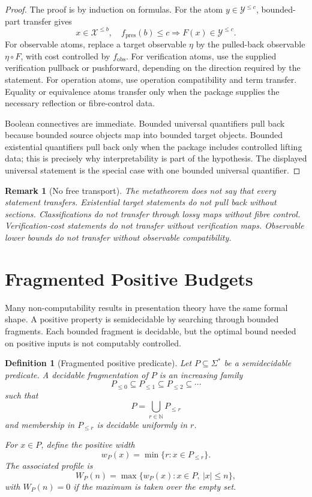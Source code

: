 \documentclass[11pt]{article}
\newtheorem{definition}[theorem]{Definition}
\newtheorem{remark}[theorem]{Remark}
\begin{document}
\begin{proof}
The proof is by induction on formulas. For the atom \(y\in\mathcal Y^{\leq c}\), bounded-part transfer gives
\[
x\in\mathcal X^{\leq b},\quad f_{\mathrm{pres}}(b)\leq c
\Longrightarrow
F(x)\in\mathcal Y^{\leq c}.
\]
For observable atoms, replace a target observable \(\eta\) by the pulled-back observable \(\eta\circ F\), with cost controlled by \(f_{\mathrm{obs}}\). For verification atoms, use the supplied verification pullback or pushforward, depending on the direction required by the statement. For operation atoms, use operation compatibility and term transfer. Equality or equivalence atoms transfer only when the package supplies the necessary reflection or fibre-control data.

Boolean connectives are immediate. Bounded universal quantifiers pull back because bounded source objects map into bounded target objects. Bounded existential quantifiers pull back only when the package includes controlled lifting data; this is precisely why interpretability is part of the hypothesis. The displayed universal statement is the special case with one bounded universal quantifier.
\end{proof}

\begin{remark}[No free transport]
The metatheorem does not say that every statement transfers. Existential target statements do not pull back without sections. Classifications do not transfer through lossy maps without fibre control. Verification-cost statements do not transfer without verification maps. Observable lower bounds do not transfer without observable compatibility.
\end{remark}

\section{Fragmented Positive Budgets}

Many non-computability results in presentation theory have the same formal shape. A positive property is semidecidable by searching through bounded fragments. Each bounded fragment is decidable, but the optimal bound needed on positive inputs is not computably controlled.

\begin{definition}[Fragmented positive predicate]
Let \(P\subseteq\Sigma^\ast\) be a semidecidable predicate. A decidable fragmentation of \(P\) is an increasing family
\[
P_{\leq0}\subseteq P_{\leq1}\subseteq P_{\leq2}\subseteq\cdots
\]
such that
\[
P=\bigcup_{r\in\mathbb N}P_{\leq r}
\]
and membership in \(P_{\leq r}\) is decidable uniformly in \(r\).

For \(x\in P\), define the positive width
\[
w_P(x)=\min\{r:x\in P_{\leq r}\}.
\]
The associated profile is
\[
W_P(n)=
\max\{w_P(x):x\in P,\ |x|\leq n\},
\]
with \(W_P(n)=0\) if the maximum is taken over the empty set.
\end{definition}
\end{document}
